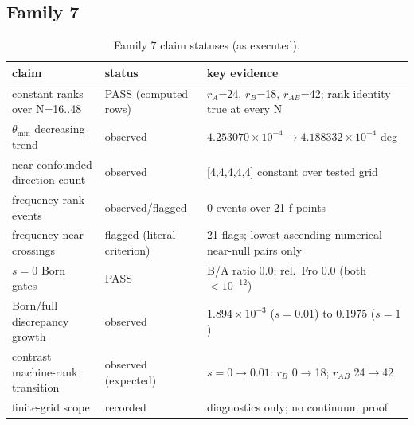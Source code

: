 \documentclass[12pt]{article}
\begin{document}
\subsection{Family 7}
\begin{table}[ht]
\centering
\small
\caption{Family 7 claim statuses (as executed).}
\label{app:tab:f7}
\begin{tabular}{p{} p{} p{}}
\toprule
claim & status & key evidence \\
\midrule
constant ranks over N=16..48 & PASS (computed rows) &
$r_A$=24, $r_B$=18, $r_{AB}$=42; rank identity true at every N \\
$\theta_{\min}$ decreasing trend & observed &
$4.253070\times10^{-4}\to4.188332\times10^{-4}$ deg \\
near-confounded direction count & observed &
[4,4,4,4,4] constant over tested grid \\
frequency rank events & observed/flagged & 0 events over 21 f points \\
frequency near crossings & flagged (literal criterion) &
21 flags; lowest ascending numerical near-null pairs only \\
$s=0$ Born gates & PASS & B/A ratio 0.0; rel.\ Fro 0.0
(both $<10^{-12}$) \\
Born/full discrepancy growth & observed &
$1.894\times10^{-3}$ ($s=0.01$) to $0.1975$ ($s=1$) \\
contrast machine-rank transition & observed (expected) &
$s=0\to0.01$: $r_B$ 0$\to$18; $r_{AB}$ 24$\to$42 \\
finite-grid scope & recorded & diagnostics only; no continuum proof \\
\bottomrule
\end{tabular}
\end{table}
\end{document}
